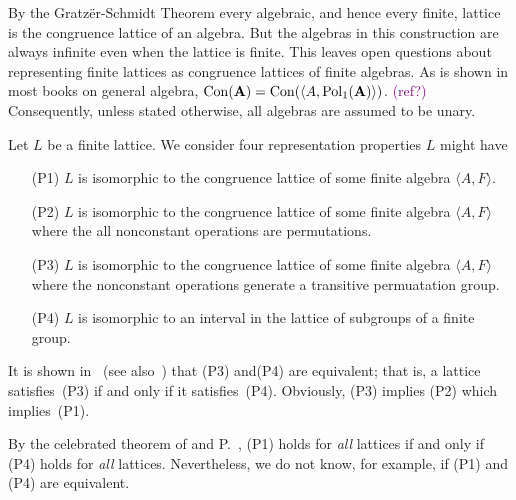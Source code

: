 By the Gratz\"er-Schmidt Theorem every algebraic, and hence
every finite, lattice is the congruence lattice of an algebra. 
But the algebras in this construction are always infinite
even when the lattice is finite. This leaves open questions
about representing finite lattices as congruence lattices of
finite algebras.
As is shown in most books on general algebra, 
$\operatorname{Con}(\mathbf{A}) = \operatorname{Con}(\langle A, \operatorname{Pol}_1(\mathbf{A}) \rangle)$. 
\textcolor{purple}{(ref?)}
Consequently, unless stated otherwise, all algebras are assumed
to be unary.


Let $L$ be a finite lattice. We consider four representation
properties $L$ might have
\begin{enumerate}
\item[(P1)]
$L$ is isomorphic to the congruence
lattice of some finite algebra $\langle A,F \rangle$.
\item[(P2)]
$L$ is isomorphic to the congruence
lattice of some finite algebra $\langle A,F \rangle$
where the all nonconstant operations are permutations.
\item[(P3)]
$L$ is isomorphic to the congruence
lattice of some finite algebra $\langle A,F \rangle$
where the nonconstant operations generate a transitive
permuatation group.
\item[(P4)]
$L$ is
isomorphic to an interval in the lattice of subgroups of a finite 
group.
\end{enumerate}

It is shown in~\cite[Lemma~4.20]{alvi:1987} (see 
also~\cite[Theorem 1.5A]{Dixon:1996}) 
that (P3) and(P4) are equivalent; that is, a lattice satisfies~(P3)
if and only if it satisfies~(P4). Obviously, (P3) implies (P2) which 
implies~(P1).

By the celebrated theorem of \Palfy and P.~\Pudlak \cite{PalfyPudlak1980}, (P1)
holds for \emph{all} lattices if and only if (P4) holds
for \emph{all} lattices. Nevertheless, we do not know, for example,
if (P1) and (P4) are equivalent.


 
 
